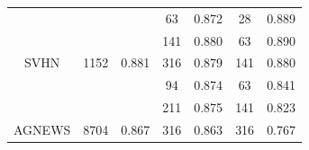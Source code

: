 \begin{table}[]
\begin{tabular}{c|cc|cccc|}
\multicolumn{1}{|c|}{}                          & \cellcolor[HTML]{E6E6E6}                          &                         & \cellcolor[HTML]{E6E6E6}63                        & 0.872                     & \cellcolor[HTML]{E6E6E6}28                        & 0.889 \\
\multicolumn{1}{|c|}{}                          & \cellcolor[HTML]{E6E6E6}                          &                         & \cellcolor[HTML]{E6E6E6}141                       & 0.880                     & \cellcolor[HTML]{E6E6E6}63                        & 0.890 \\
\multicolumn{1}{|c|}{\multirow{-3}{*}{SVHN}}    & \multirow{-3}{*}{\cellcolor[HTML]{E6E6E6}1152}    & \multirow{-3}{*}{0.881} & \cellcolor[HTML]{E6E6E6}316                       & 0.879                     & \cellcolor[HTML]{E6E6E6}141                       & 0.880 \\ \hline
\multicolumn{1}{|c|}{}                          & \cellcolor[HTML]{E6E6E6}                          &                         & \cellcolor[HTML]{E6E6E6}94                        & 0.874                     & \cellcolor[HTML]{E6E6E6}63                        & 0.841 \\
\multicolumn{1}{|c|}{}                          & \cellcolor[HTML]{E6E6E6}                          &                         & \cellcolor[HTML]{E6E6E6}211                       & 0.875                     & \cellcolor[HTML]{E6E6E6}141                       & 0.823 \\
\multicolumn{1}{|c|}{\multirow{-3}{*}{AGNEWS}}  & \multirow{-3}{*}{\cellcolor[HTML]{E6E6E6}8704}    & \multirow{-3}{*}{0.867} & \cellcolor[HTML]{E6E6E6}316                       & 0.863                     & \cellcolor[HTML]{E6E6E6}316                       & 0.767 \\ \hline
\end{tabular}
\end{table}

